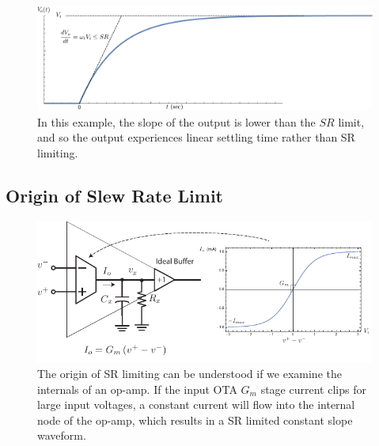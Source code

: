 \begin{figure}[tb]
\begin{center}
\includegraphics[width=.8\columnwidth]{SR_case2}
\end{center}
\caption{In this example, the slope of the output is lower than the $SR$ limit, and so the output experiences linear settling time rather than SR limiting.} \label{fig:SR_case2}
\end{figure}
\subsection{Origin of Slew Rate Limit}
\begin{figure}[tb]
\begin{center}
\includegraphics[width=\columnwidth]{opamp_ota_SR}
\end{center}
\caption{The origin of SR limiting can be understood if we examine the internals of an op-amp. If the input OTA $G_m$ stage current clips for large input voltages, a constant current will flow into the internal node of the op-amp, which results in a SR limited constant slope waveform.} \label{fig:opamp_ota_SR}
\end{figure}

